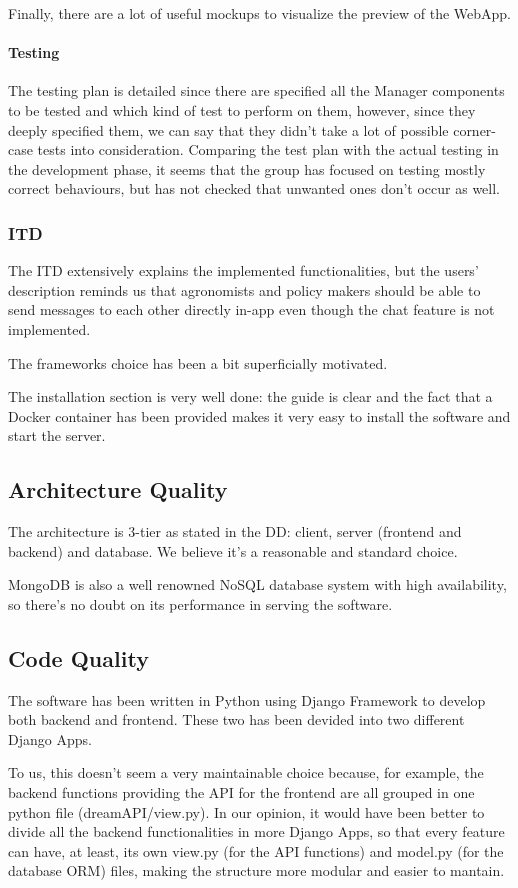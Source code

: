 \documentclass[table, 12pt]{article}
\begin{document}
Finally, there are a lot of useful mockups to visualize the preview of the WebApp.

\paragraph{Testing}
The testing plan is detailed since there are specified all the Manager components to be tested and  which kind of test to perform on them, however, since they deeply specified them, we can say that they didn't take a lot of possible corner-case tests into consideration. Comparing the test plan with the actual testing in the development phase, it seems that the group has focused on testing mostly correct behaviours, but has not checked that unwanted ones don't occur as well. 

\subsubsection{ITD}
The ITD extensively explains the implemented functionalities, but the users' description reminds us that agronomists and policy makers should be able to send messages to each other directly in-app even though the chat feature is not implemented.

The frameworks choice has been a bit superficially motivated.

The installation section is very well done: the guide is clear and the fact that a Docker container has been provided makes it very easy to install the software and start the server.

\subsection{Architecture Quality}
The architecture is 3-tier as stated in the DD: client, server (frontend and backend) and database. We believe it's a reasonable and standard choice.

MongoDB is also a well renowned NoSQL database system with high availability, so there's no doubt on its performance in serving the software.

\subsection{Code Quality}
The software has been written in Python using Django Framework to develop both backend and frontend. These two has been devided into two different Django Apps. 

To us, this doesn't seem a very maintainable choice because, for example, the backend functions providing the API for the frontend are all grouped in one python file (dreamAPI/view.py). In our opinion, it would have been better to divide all the backend functionalities in more Django Apps, so that every feature can have, at least, its own view.py (for the API functions) and model.py (for the database ORM) files, making the structure more modular and easier to mantain.
\end{document}
